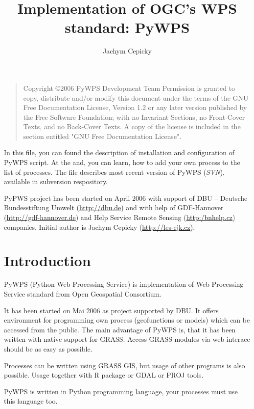 \documentclass[a4paper,11pt]{article}
\author{Jachym Cepicky}
\title{Implementation of OGC's WPS standard: PyWPS}
\newcommand{\version}{\emph{SVN}}
\begin{document}
\maketitle{}

\bigskip
\begin{quote}
    Copyright \copyright  2006 PyWPS Development Team
    Permission is granted to copy, distribute and/or modify this document
    under the terms of the GNU Free Documentation License, Version 1.2
    or any later version published by the Free Software Foundation;
    with no Invariant Sections, no Front-Cover Texts, and no Back-Cover Texts.
    A copy of the license is included in the section entitled "GNU
    Free Documentation License".
\end{quote}
\bigskip


In this file, you can found the description of installation and
configuration of PyWPS script. At the and, you can learn, how to add
your own process to the list of processes. The file describes most recent
version of PyWPS (\version), available in subversion respository.

PyPWS project has been started on April 2006 with support of DBU --
Deutsche Bundesstiftung Umwelt (\url{http://dbu.de}) and with help of
GDF-Hannover (\url{http://gdf-hannover.de}) and Help Service Remote
Sensing (\url{http:/bnhelp.cz}) companies. Initial author is Jachym
Cepicky (\url{http://les-ejk.cz}).
    

    \tableofcontents

\newpage

\section{Introduction}
PyWPS (Python Web Processing Service) is implementation of Web
Processing Service standard from Open Geospatial Consortium.

It has been started on Mai 2006 as project supported by DBU. It offers
environment for programming own process (geofunctions or models) which can
be accessed from the public. The main advantage of PyWPS is, that it has
been written with native support for GRASS. Access GRASS modules via web
interace should be as easy as possible.

Processes can be written using GRASS GIS, but usage of other programs is
also possible. Usage together with R package or GDAL or PROJ tools.

PyWPS is written in Python programming language, your processes must use
this language too. 
\end{document}
